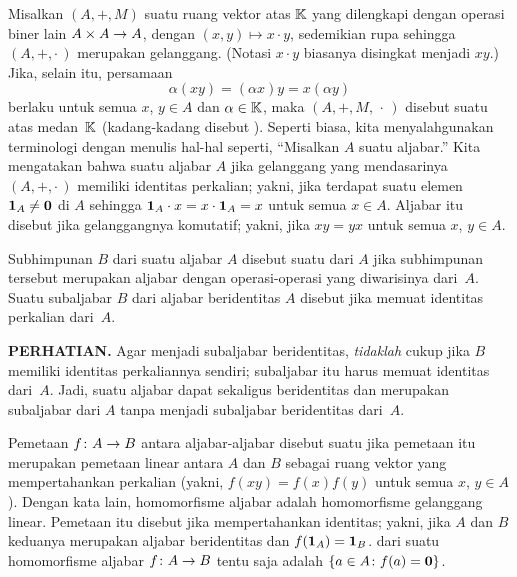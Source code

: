 \begin{defn}\label{defn_alg} Misalkan $(A,+,M)$ suatu ruang vektor atas $\mathbb{K}$ yang dilengkapi dengan
operasi biner lain $A \times A \rightarrow A$, dengan $(x,y) \mapsto x \cdot y$, sedemikian
rupa sehingga $(A,+,\cdot\,)$ merupakan gelanggang. (Notasi $x \cdot y$ biasanya disingkat menjadi $xy$.) Jika, selain itu, persamaan
  \begin{equation}\label{eq_def_algebra}
     \alpha (xy) = (\alpha x)y = x(\alpha y)
  \end{equation}
berlaku untuk semua $x$, $y \in A$ dan $\alpha \in \mathbb{K}$, maka $(A,+,M,\,\cdot\,)$ disebut suatu
 atas medan~$\mathbb{K}$ (kadang-kadang disebut ). Seperti biasa, kita menyalahgunakan terminologi dengan menulis hal-hal seperti, ``Misalkan $A$ suatu
aljabar.'' Kita mengatakan bahwa suatu aljabar $A$
 jika gelanggang yang mendasarinya $(A,+,\cdot\,)$ memiliki identitas perkalian; yakni, jika terdapat
suatu elemen $\mathbf{1}_A \ne \mathbf{0}$ di $A$ sehingga $\mathbf{1}_A \cdot x = x \cdot \mathbf{1}_A = x$ untuk semua $x \in A$.
  Aljabar itu disebut
 jika gelanggangnya komutatif; yakni, jika $xy = yx$ untuk semua $x$, $y \in A$.

Subhimpunan $B$ dari suatu aljabar $A$ disebut suatu
 dari $A$ jika subhimpunan tersebut merupakan aljabar dengan operasi-operasi yang diwarisinya dari~$A$. Suatu
subaljabar $B$ dari aljabar beridentitas $A$ disebut
 jika memuat identitas perkalian dari~$A$.

\textbf{PERHATIAN.} Agar menjadi subaljabar beridentitas, 
\emph{tidaklah} cukup jika $B$ memiliki identitas perkaliannya sendiri; subaljabar itu harus memuat identitas dari~$A$. Jadi, suatu
aljabar dapat sekaligus beridentitas dan merupakan subaljabar dari $A$ tanpa menjadi subaljabar beridentitas
dari~$A$.

Pemetaan $f\colon A \rightarrow B$ antara aljabar-aljabar disebut suatu
 jika pemetaan itu merupakan pemetaan linear antara $A$ dan $B$ sebagai ruang vektor yang mempertahankan perkalian
(yakni, $f(xy) = f(x)f(y)$ untuk semua $x$, $y \in A$). Dengan kata lain, homomorfisme aljabar adalah homomorfisme gelanggang linear.
Pemetaan itu disebut
 jika mempertahankan identitas; yakni, jika $A$ dan $B$ keduanya merupakan aljabar beridentitas dan $f(\mathbf{1}_A) = \mathbf{1}_B$.
 dari suatu homomorfisme aljabar $f\colon A \rightarrow B$ tentu saja adalah $\{a \in A \colon f(a) = \mathbf{0}\}$.


\end{defn}
